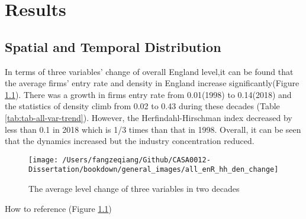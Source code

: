 \documentclass[
  12pt,
  oneside]{book}
\begin{document}
\hypertarget{results}{%
\chapter{Results}\label{results}}

\hypertarget{spatial-and-temporal-distribution}{%
\section{Spatial and Temporal Distribution}\label{spatial-and-temporal-distribution}}

In terms of three variables' change of overall England level,it can be found that the average firms' entry rate and density in England increase significantly(Figure \ref{fig:fig-all-var-trend}). There was a growth in firms entry rate from 0.01(1998) to 0.14(2018) and the statistics of density climb from 0.02 to 0.43 during these decades (Table \ref{tab:tab-all-var-trend}). However, the Herfindahl-Hirschman index decreased by less than 0.1 in 2018 which is 1/3 times than that in 1998. Overall, it can be seen that the dynamics increased but the industry concentration reduced.

\begin{figure}
\texttt{[image: /Users/fangzeqiang/Github/CASA0012-Dissertation/bookdown/general\_images/all\_enR\_hh\_den\_change]} \caption{The average level change of three variables in two decades}\label{fig:fig-all-var-trend}
\end{figure}

How to reference (Figure \ref{fig:fig-all-var-trend})
\end{document}
